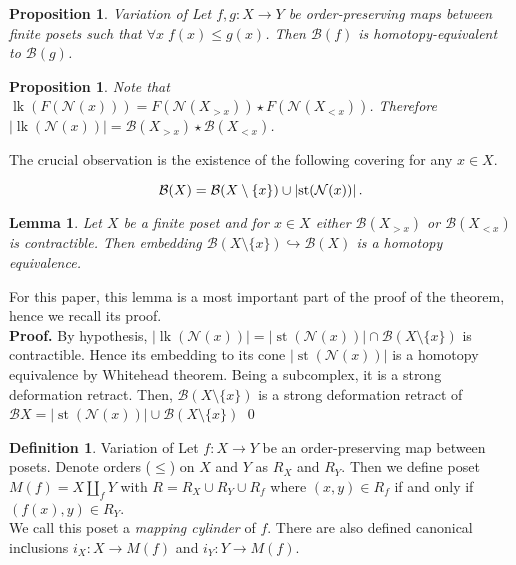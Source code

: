 \documentclass[english,12pt]{article}
\newcounter{stmcounter}[section]
\numberwithin{equation}{section}
\newtheorem{proposition}[stmcounter]{Proposition}
\newtheorem{lemma}[stmcounter]{Lemma}
\theoremstyle{definition}
\newtheorem{definition}[stmcounter]{Definition}
\theoremstyle{remark}
\newenvironment{pf}{\noindent\textbf{Proof.}}{\qed}
\newcommand{\define}[1]{{\textit{#1}}}
\renewcommand{\leq}{\leqslant}
\begin{document}
\begin{proposition} {Variation of \cite[Lemma 2.2]{Bar11}}
  \label{prop:comparison}
  Let $f,g : X \to Y$ be order-preserving maps between finite posets such that $\forall x\;f(x) \leq g(x)$. Then $\mathcal{B}(f)$ is homotopy-equivalent to $\mathcal{B}(g)$.
\end{proposition}

\begin{proposition}
  Note that $\operatorname{lk}(F(\mathcal{N}(x))) = F(\mathcal{N}(X_{>x})) \star F(\mathcal{N}(X_{<x}))$. Therefore $\left|\operatorname{lk}(\mathcal{N}(x))\right| = \mathcal{B}(X_{>x}) \star \mathcal{B}(X_{<x})$.
\end{proposition}

The crucial observation is the existence of the following covering for any $x \in X$.

\begin{equation}\label{covering}
  \mathcal{B}(X) = \mathcal{B}(X \setminus \{x\}) \cup \left|\operatorname{st}(\mathcal{N}(x))\right|.\\
\end{equation}

\begin{lemma}
  \label{lem:homotopy}
  Let $X$ be a finite poset and for $x \in X$ either $\mathcal{B}(X_{>x})$ or $\mathcal{B}(X_{<x})$ is contractible. Then embedding $\mathcal{B}(X \setminus \{x\}) \hookrightarrow \mathcal{B}(X)$ is a homotopy equivalence.
\end{lemma}

For this paper, this lemma is a most important part of the proof of the theorem, hence we recall its proof.\\

\begin{pf}
  By hypothesis, $\left|\operatorname{lk}(\mathcal{N}(x))\right| = \left|\operatorname{st}(\mathcal{N}(x))\right| \cap \mathcal{B}(X \setminus \{x\})$ is contractible. Hence its embedding to its cone $\left|\operatorname{st}(\mathcal{N}(x))\right|$ is a homotopy equivalence by Whitehead theorem. Being a subcomplex, it is a strong deformation retract. Then, $\mathcal{B}(X \setminus \{x\})$ is a strong deformation retract of $\mathcal{B}X = \left|\operatorname{st}(\mathcal{N}(x))\right| \cup \mathcal{B}(X \setminus \{x\})$
\end{pf}

\begin{definition} {Variation of \cite[Proposition 2.1]{Bar11}}
  Let $f : X \to Y$ be an order-preserving map between posets. Denote orders ($\leq$) on $X$ and $Y$ as $R_X$ and $R_Y$. Then we define poset $M(f) = X \coprod_f Y$ with $R = R_X \cup R_Y \cup R_{f}$ where $(x,y) \in R_f$ if and only if $(f(x),y) \in R_Y$.\\

  We call this poset a \define{mapping cylinder} of $f$. There are also defined canonical inсlusions $i_X : X \to M(f)$ and $i_Y : Y \to M(f)$.
\end{definition}
\end{document}
